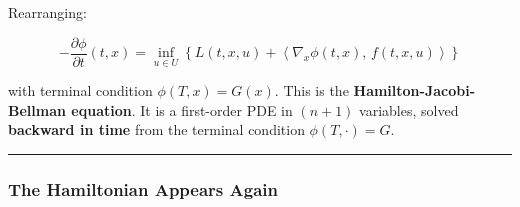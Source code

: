 \documentclass{article}
\begin{document}
\begin{mathrequirementsbox}
\begin{tldrbox}
    
Rearranging:

$$-\frac{\partial \phi}{\partial t}(t, x) = \inf_{u \in U} \left\{ L(t, x, u) + \left\langle \nabla_x \phi(t, x),\, f(t, x, u) \right\rangle \right\}$$

with terminal condition $\phi(T, x) = G(x)$. This is the \textbf{Hamilton-Jacobi-Bellman equation}. It is a first-order PDE in $(n+1)$ variables, solved \textbf{backward in time} from the terminal condition $\phi(T, \cdot) = G$.
\end{tldrbox}
\end{mathrequirementsbox}

\medskip\hrule\medskip

\subsubsection{The Hamiltonian Appears Again}
\end{document}
